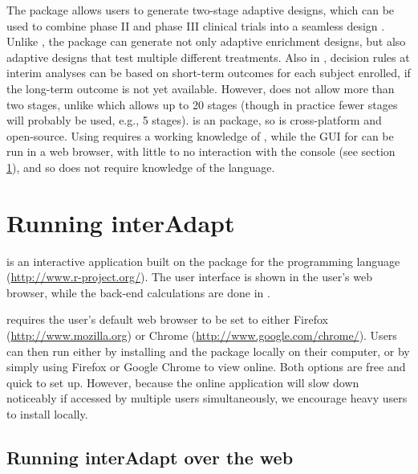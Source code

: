 \documentclass[article]{jss}
\begin{document}
The  package allows  users to generate  two-stage adaptive designs, which can be used to combine phase II and phase III clinical trials into a seamless design \citep{parsons2012r}. Unlike , the  package can generate  not only adaptive enrichment designs, but also adaptive designs that test multiple different treatments. Also in , decision rules at interim analyses can be based on short-term outcomes for each subject enrolled, if the long-term outcome is not yet available. However,  does not allow more than two stages, unlike   which allows up to 20 stages (though in practice fewer stages will probably be used, e.g., 5 stages).  is an   package, so is cross-platform and open-source. Using 
 requires a working knowledge of , while the GUI for  can be run in a web browser, with little to no interaction with the  console (see section \ref{sec:running-interAdapt}), and so does not require knowledge of the  language.

\section{Running interAdapt }%
\label{sec:running-interAdapt}

 is an interactive application built on the  package \citep{shiny2013manual} for the  programming language (\url{http://www.r-project.org/}). The user interface is shown in the user’s web browser, while the back-end calculations are done in . 

 requires the user's default web browser to be set to either Firefox (\url{http://www.mozilla.org}) or Chrome (\url{http://www.google.com/chrome/}). Users can then run  either by installing  and the   package locally on their computer, or by simply using Firefox or Google Chrome to view  online. Both options are free and quick to set up. However, because the online application will slow down noticeably if accessed by multiple users simultaneously, we encourage heavy users to install  locally.


\subsection{Running interAdapt over the web}
\label{sub:running-online}
\end{document}
